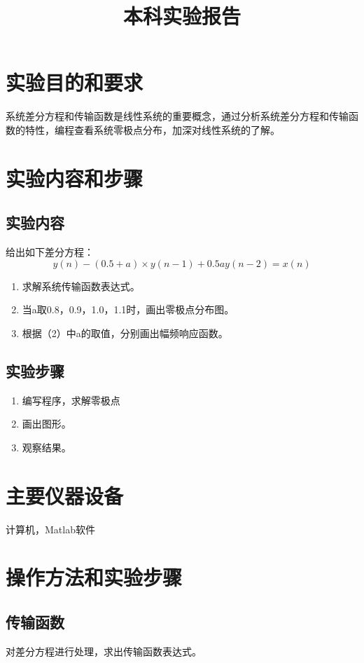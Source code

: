 \documentclass{zjureport}
\title{本科实验报告}
\date{\zhtoday}
\begin{document}
\makecover
\makeheader


\section{实验目的和要求}
  系统差分方程和传输函数是线性系统的重要概念，通过分析系统差分方程和传输函数的特性，编程查看系统零极点分布，加深对线性系统的了解。
\section{实验内容和步骤}

  \subsection{实验内容}

    给出如下差分方程：
    $$y(n) - (0.5+a)\times y(n-1) + 0.5ay(n-2) = x(n)$$
    \begin{enumerate}
      \item 求解系统传输函数表达式。
      \item 当a取0.8，0.9，1.0，1.1时，画出零极点分布图。
      \item 根据（2）中a的取值，分别画出幅频响应函数。
    \end{enumerate}

  \subsection{实验步骤}
    \begin{enumerate}
      \item 编写程序，求解零极点
      \item 画出图形。
      \item 观察结果。
    \end{enumerate}

\section{主要仪器设备}
  计算机，Matlab软件

\section{操作方法和实验步骤}
  \subsection{传输函数}
    对差分方程进行处理，求出传输函数表达式。
\end{document}
